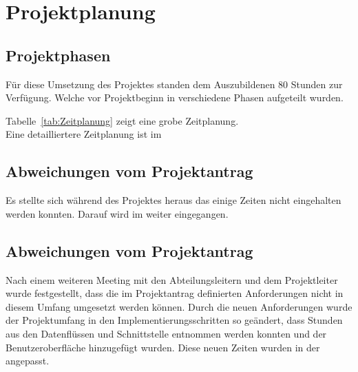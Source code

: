 \section{Projektplanung} 

\subsection{Projektphasen}
\label{sec:Projektphasen}
Für diese Umsetzung des Projektes standen dem Auszubildenen 80 Stunden zur Verfügung. 
Welche vor Projektbeginn in verschiedene Phasen aufgeteilt wurden. 

Tabelle~\ref{tab:Zeitplanung} zeigt eine grobe Zeitplanung.
\\

Eine detailliertere Zeitplanung ist im 


\subsection{Abweichungen vom Projektantrag}
\label{sec:Abweichung Projektantrag}
Es stellte sich während des Projektes heraus das einige Zeiten nicht eingehalten werden konnten. 
Darauf wird im  weiter eingegangen.


\subsection{Abweichungen vom Projektantrag}
\label{sec:AbweichungenProjektantrag}
Nach einem weiteren Meeting mit den Abteilungsleitern und dem Projektleiter wurde festgestellt, dass die im Projektantrag
definierten Anforderungen nicht in diesem Umfang umgesetzt werden können. Durch die neuen Anforderungen wurde der Projektumfang
in den Implementierungsschritten so geändert, dass Stunden aus den Datenflüssen und Schnittstelle entnommen werden konnten und der 
Benutzeroberfläche hinzugefügt wurden. Diese neuen Zeiten wurden in der  angepasst.


